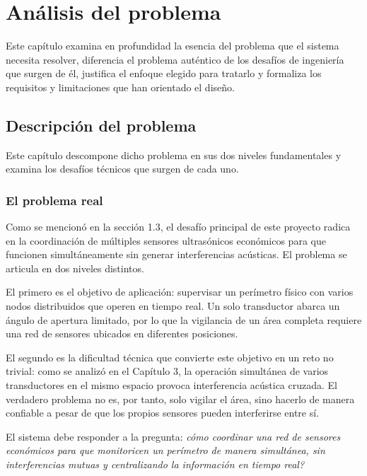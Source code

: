 \chapter{Análisis del problema}
\label{chap:analisis_problema}

Este capítulo examina en profundidad la esencia del problema que el sistema necesita resolver, diferencia el problema auténtico de los desafíos de ingeniería que surgen de él, justifica el enfoque elegido para tratarlo y formaliza los requisitos y limitaciones que han orientado el diseño.

\section{Descripción del problema}

Este capítulo descompone dicho problema en sus dos niveles fundamentales y examina los desafíos técnicos que surgen de cada uno.

\subsection{El problema real}

Como se mencionó en la sección 1.3, el desafío principal de este proyecto radica en la coordinación de múltiples sensores ultrasónicos económicos para que funcionen simultáneamente sin generar interferencias acústicas. El problema se articula en dos niveles distintos.

El primero es el objetivo de aplicación: supervisar un perímetro físico con varios nodos distribuidos que operen en tiempo real. Un solo transductor abarca un ángulo de apertura limitado, por lo que la vigilancia de un área completa requiere una red de sensores ubicados en diferentes posiciones.

El segundo es la dificultad técnica que convierte este objetivo en un reto no trivial: como se analizó en el Capítulo 3, la operación simultánea de varios transductores en el mismo espacio provoca interferencia acústica cruzada. El verdadero problema no es, por tanto, solo vigilar el área, sino hacerlo de manera confiable a pesar de que los propios sensores pueden interferirse entre sí.

El sistema debe responder a la pregunta: \textit{\textquestiondown{}cómo coordinar una red de sensores económicos para que monitoricen un perímetro de manera simultánea, sin interferencias mutuas y centralizando la información en tiempo real?}

